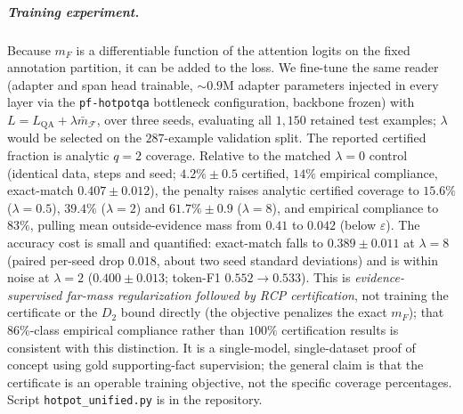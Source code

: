 \documentclass[10pt,twocolumn]{article}
\begin{document}
\subparagraph{Training experiment.} Because $m_F$ is a differentiable function of the attention logits on the fixed annotation partition, it can be added to the loss. We fine-tune the same reader (adapter and span head trainable, $\sim0.9$M adapter parameters injected in every layer via the \texttt{pf-hotpotqa} bottleneck configuration, backbone frozen) with $L=L_{\mathrm{QA}}+\lambda\bar m_{\mathcal{F}}$, over three seeds, evaluating all $1{,}150$ retained test examples; $\lambda$ would be selected on the $287$-example validation split. The reported certified fraction is analytic $q{=}2$ coverage. Relative to the matched $\lambda{=}0$ control (identical data, steps and seed; $4.2\%\pm0.5$ certified, $14\%$ empirical compliance, exact-match $0.407\pm0.012$), the penalty raises analytic certified coverage to $15.6\%$ ($\lambda{=}0.5$), $39.4\%$ ($\lambda{=}2$) and $61.7\%\pm0.9$ ($\lambda{=}8$), and empirical compliance to $83\%$, pulling mean outside-evidence mass from $0.41$ to $0.042$ (below $\varepsilon$). The accuracy cost is small and quantified: exact-match falls to $0.389\pm0.011$ at $\lambda{=}8$ (paired per-seed drop $0.018$, about two seed standard deviations) and is within noise at $\lambda{=}2$ ($0.400\pm0.013$; token-F1 $0.552\to0.533$). This is \emph{evidence-supervised far-mass regularization followed by RCP certification}, not training the certificate or the $D_2$ bound directly (the objective penalizes the exact $m_F$); that $86\%$-class empirical compliance rather than $100\%$ certification results is consistent with this distinction. It is a single-model, single-dataset proof of concept using gold supporting-fact supervision; the general claim is that the certificate is an operable training objective, not the specific coverage percentages. Script \texttt{hotpot\_unified.py} is in the repository.
\end{document}
